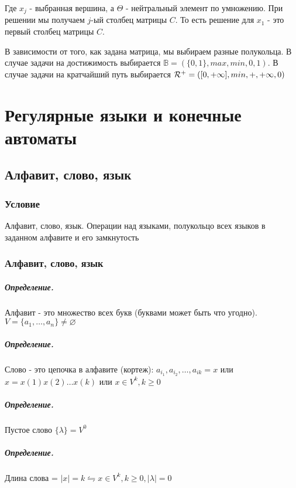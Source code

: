 \documentclass{report}
\begin{document}
Где $x_{j}$ - выбранная вершина, а $\Theta$ - нейтральный элемент по умножению. При решении
мы получаем  $j$-ый столбец матрицы  $C$. То есть решение для $x_1$ - это первый столбец матрицы
$C$.

\medskip

В зависимости от того, как задана матрица, мы выбираем разные полукольца. В случае задачи
на достижимость выбирается $\mathbb{B} = (\{0,1\},max,min,0,1 )$. В случае задачи на кратчайший
путь выбирается $ {\cal R}^{+} = ([0, +\infty], min, +, +\infty, 0)$

\newpage


\chapter{Регулярные языки и конечные автоматы}

\section{Алфавит, слово, язык}
\subsection{Условие}
Алфавит, слово, язык. Операции над языками, полукольцо всех языков в
заданном алфавите и его замкнутость

\subsection{Алфавит, слово, язык}
\paragraph*{Определение.}
Алфавит - это множество всех букв (буквами может быть что угодно).
$V = \{a_1,\ldots, a_{n}\} \neq \varnothing $

\paragraph*{Определение.}
Слово - это цепочка в алфавите (кортеж): $a_{i_1},a_{i_2},\ldots,a_{ik} = x$ или
$x=x(1)x(2)\ldots x(k)$ или $x \in V^{k}, k \ge 0$ 

\paragraph*{Определение.}
Пустое слово $\{\lambda\} = V^{0}$

\paragraph*{Определение.}
Длина слова = $ \mid x  \mid = k \leftrightharpoons x \in V^{k}, k \ge 0,  \mid \lambda  \mid = 0$ 
\end{document}
